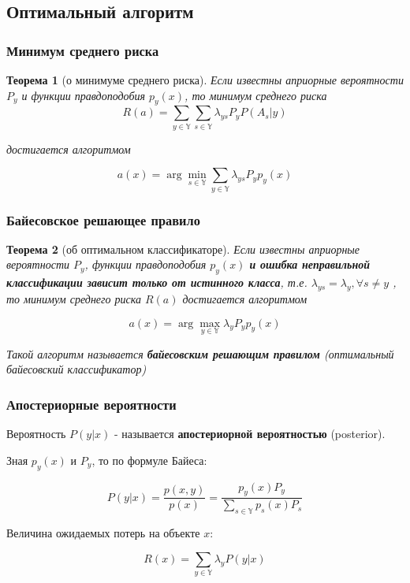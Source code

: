 \documentclass{beamer}
\newtheorem{rustheorem}{Теорема}
\begin{document}
	\subsection{Оптимальный алгоритм}
	
	\begin{frame}
		\frametitle{Минимум среднего риска}
		\begin{rustheorem}[о минимуме среднего риска]
		Если известны априорные вероятности $P_y$ и функции правдоподобия $p_y(x)$, то минимум среднего риска
		\[
		R(a) = \sum_{y \in \mathbb{Y}} \sum_{s \in \mathbb{Y}}
		\lambda_{ys} P_y P(A_s | y)
		\]
		
		достигается алгоритмом
		
		\[
		a(x) = \arg \min_{s \in \mathbb{Y}} \sum_{y \in \mathbb{Y}} \lambda_{ys} P_y p_y(x)
		\]
		\end{rustheorem}
	\end{frame}
	
	\begin{frame}
		\frametitle{Байесовское решающее правило}
		
		\begin{rustheorem}[об оптимальном классификаторе]
			Если известны априорные вероятности $P_y$, функции правдоподобия $p_y(x)$
			\textbf{и ошибка неправильной классификации зависит только от истинного класса}, т.е.
			$\lambda_{ys} = \lambda_{y}, \forall s \ne y$
			, то минимум среднего риска $R(a)$ достигается алгоритмом
			
			\[
			a(x) = \arg \max_{y \in \mathbb{Y}} \lambda_{y} P_y p_y(x)
			\]

			Такой алгоритм называется \textbf{байесовским решающим правилом} (оптимальный байесовский классификатор)
		\end{rustheorem}
		
	\end{frame}
	
	\begin{frame}
		\frametitle{Апостериорные вероятности}
		Вероятность $P(y | x)$ - называется \textbf{апостериорной вероятностью} (posterior).
		
		\vspace{10pt}
		
		Зная $p_y(x)$ и $P_y$, то по формуле Байеса:
		
		\[
		P(y | x) = 
		\frac{p(x, y)}{p(x)} =
		\frac{p_y(x) P_y}{\sum_{s \in \mathbb{Y}} p_s(x) P_s}
		\]
		
		\vspace{15pt}
		
		Величина ожидаемых потерь на объекте $x$:
		
		\[
		R(x) =
		\sum_{y \in \mathbb{Y}} \lambda_{y} P(y | x)
		\]
	\end{frame}
	
\end{document}
